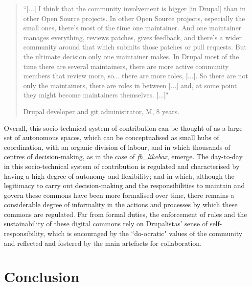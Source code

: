 \begin{quotation}
``[...] I think that the community involvement is bigger [in Drupal] than in other Open Source projects. In other Open Source projects, especially the small ones, there's most of the time one maintainer. And one maintainer manages everything, reviews patches, gives feedback, and there's a wider community around that which submits those patches or pull requests. But the ultimate decision only one maintainer makes. In Drupal most of the time there are several maintainers, there are more active community members that review more, so... there are more roles, [...]. So there are not only the maintainers, there are roles in between [...] and, at some point they might become maintainers themselves. [...]"
\begin{flushright}\footnotesize{Drupal developer and git administrator, M, 8 years.}\end{flushright}
\end{quotation}

Overall, this socio-technical system of contribution can be thought of as a large set of autonomous spaces, which can be conceptualised as small hubs of coordination, with an organic division of labour, and in which thousands of centres of decision-making, as in the case of \textit{fb\_likebox}, emerge. The day-to-day in this socio-technical system of contribution is regulated and characterised by having a high degree of autonomy and flexibility; and in which, although the legitimacy to carry out decision-making and the responsibilities to maintain and govern these commons have been more formalised over time, there remains a considerable degree of informality in the actions and processes by which these commons are regulated. Far from formal duties, the enforcement of rules and the sustainability of these digital commons rely on Drupalistas' sense of self-responsibility, which is encouraged by the ``do-ocratic" values of the community and reflected and fostered by the main artefacts for collaboration.

\section{Conclusion}

